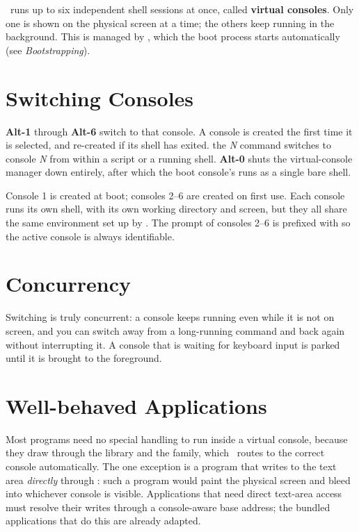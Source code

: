 \thedos\ runs up to six independent shell sessions at once, called \textbf{virtual consoles}. Only one is shown on the physical screen at a time; the others keep running in the background. This is managed by , which the boot process starts automatically (see \emph{Bootstrapping}).

\section{Switching Consoles}

\begin{outline}
\1\textbf{Alt-1} through \textbf{Alt-6} switch to that console. A console is created the first time it is selected, and re-created if its shell has exited.
\1the  \emph{N} command switches to console \emph{N} from within a script or a running shell.
\1\textbf{Alt-0} shuts the virtual-console manager down entirely, after which the boot console's  runs as a single bare shell.
\end{outline}

Console 1 is created at boot; consoles 2--6 are created on first use. Each console runs its own  shell, with its own working directory and screen, but they all share the same environment set up by . The prompt of consoles 2--6 is prefixed with \code{[\emph{N}]} so the active console is always identifiable.

\section{Concurrency}

Switching is truly concurrent: a console keeps running even while it is not on screen, and you can switch away from a long-running command and back again without interrupting it. A console that is waiting for keyboard input is parked until it is brought to the foreground.

\section{Well-behaved Applications}

Most programs need no special handling to run inside a virtual console, because they draw through the  library and the  family, which \thedos\ routes to the correct console automatically. The one exception is a program that writes to the text area \emph{directly} through : such a program would paint the physical screen and bleed into whichever console is visible. Applications that need direct text-area access must resolve their writes through a console-aware base address; the bundled applications that do this are already adapted.


